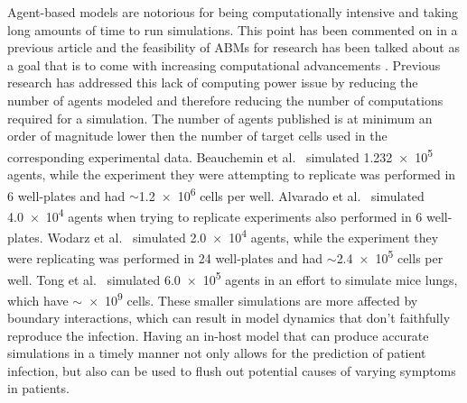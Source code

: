Agent-based models are notorious for being computationally intensive and taking long amounts of time to run simulations. This point has been commented on in a previous article \citep{gallagher_causes_2018} and the feasibility of ABMs for research has been talked about as a goal that is to come with increasing computational advancements \citep{bauer_agent-based_2009}. Previous research has addressed this lack of computing power issue by reducing the number of agents modeled and therefore reducing the number of computations required for a simulation. The number of agents published is at minimum an order of magnitude lower then the number of target cells used in the corresponding experimental data. Beauchemin et al.\ \citep{beauchemin_simple_2005} simulated \num{1.232e5} agents, while the experiment they were attempting to replicate was performed in 6 well-plates and had $\sim$\num{1.2e6} cells per well. Alvarado et al.\ \citep{alvarado_cellular-level_2018} simulated \num{4.0e4} agents when trying to replicate experiments also performed in 6 well-plates. Wodarz et al.\ \citep{wodarz_laws_2014} simulated \num{2.0e4} agents, while the experiment they were replicating was performed in 24 well-plates and had $\sim$\num{2.4e5} cells per well. Tong et al.\ \citep{tong_development_2015} simulated \num{6.0e5} agents in an effort to simulate mice lungs, which have $\sim$\num{e9} cells. These smaller simulations are more affected by boundary interactions, which can result in model dynamics that don't faithfully reproduce the infection. Having an in-host model that can produce accurate simulations in a timely manner not only allows for the prediction of patient infection, but also can be used to flush out potential causes of varying symptoms in patients. 

